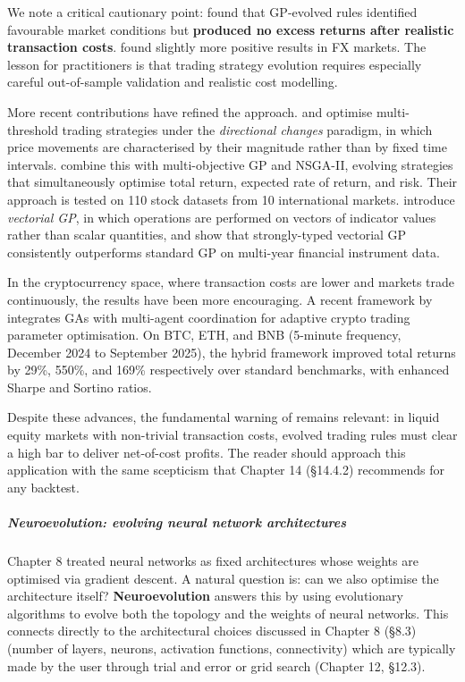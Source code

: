 We note a critical cautionary point: \cite{Allen1999} found that GP-evolved rules identified favourable market conditions but \textbf{produced no excess returns after realistic transaction costs}. \cite{Neely1997} found slightly more positive results in FX markets. The lesson for practitioners is that trading strategy evolution requires especially careful out-of-sample validation and realistic cost modelling.

More recent contributions have refined the approach. \cite{Salman2022} and \cite{Salman2025} optimise multi-threshold trading strategies under the \textit{directional changes} paradigm, in which price movements are characterised by their magnitude rather than by fixed time intervals. \cite{Long2025} combine this with multi-objective GP and NSGA-II, evolving strategies that simultaneously optimise total return, expected rate of return, and risk. Their approach is tested on 110 stock datasets from 10 international markets. \cite{Menoita2025} introduce \textit{vectorial GP}, in which operations are performed on vectors of indicator values rather than scalar quantities, and show that strongly-typed vectorial GP consistently outperforms standard GP on multi-year financial instrument data.

In the cryptocurrency space, where transaction costs are lower and markets trade continuously, the results have been more encouraging. A recent framework by \cite{Tian2025} integrates GAs with multi-agent coordination for adaptive crypto trading parameter optimisation. On BTC, ETH, and BNB (5-minute frequency, December 2024 to September 2025), the hybrid framework improved total returns by 29\%, 550\%, and 169\% respectively over standard benchmarks, with enhanced Sharpe and Sortino ratios.

Despite these advances, the fundamental warning of \cite{Allen1999} remains relevant: in liquid equity markets with non-trivial transaction costs, evolved trading rules must clear a high bar to deliver net-of-cost profits. The reader should approach this application with the same scepticism that Chapter 14 (§14.4.2) recommends for any backtest.

\subparagraph{Neuroevolution: evolving neural network architectures}

Chapter 8 treated neural networks as fixed architectures whose weights are optimised via gradient descent. A natural question is: can we also optimise the architecture itself? \textbf{Neuroevolution} answers this by using evolutionary algorithms to evolve both the topology and the weights of neural networks. This connects directly to the architectural choices discussed in Chapter 8 (§8.3) (number of layers, neurons, activation functions, connectivity) which are typically made by the user through trial and error or grid search (Chapter 12, §12.3).

